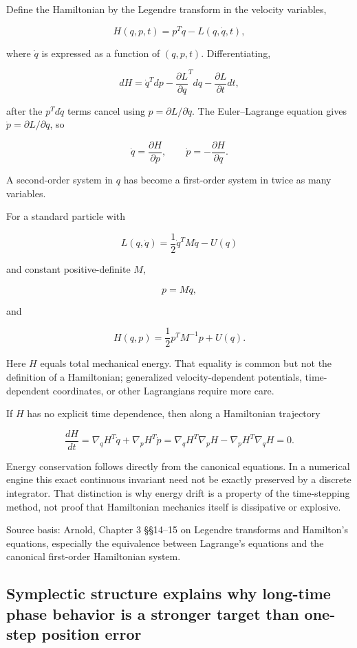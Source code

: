 Define the Hamiltonian by the Legendre transform in the velocity variables,

\[
H(q,p,t)
=
p^T\dot q-L(q,\dot q,t),
\]

where \(\dot q\) is expressed as a function of \((q,p,t)\). Differentiating,

\[
dH
=
\dot q^Tdp
-
\frac{\partial L}{\partial q}^Tdq
-
\frac{\partial L}{\partial t}dt,
\]

after the \(p^Td\dot q\) terms cancel using \(p=\partial L/\partial\dot q\). The Euler--Lagrange equation gives \(\dot p=\partial L/\partial q\), so

\[
\boxed{
\dot q=
\frac{\partial H}{\partial p},
\qquad
\dot p=
-\frac{\partial H}{\partial q}.
}
\]

A second-order system in \(q\) has become a first-order system in twice as many variables.

For a standard particle with

\[
L(q,\dot q)
=
\frac12\dot q^TM\dot q-U(q)
\]

and constant positive-definite \(M\),

\[
p=M\dot q,
\]

and

\[
H(q,p)
=
\frac12p^TM^{-1}p+U(q).
\]

Here \(H\) equals total mechanical energy. That equality is common but not the definition of a Hamiltonian; generalized velocity-dependent potentials, time-dependent coordinates, or other Lagrangians require more care.

If \(H\) has no explicit time dependence, then along a Hamiltonian trajectory

\[
\frac{dH}{dt}
=
\nabla_qH^T\dot q
+
\nabla_pH^T\dot p
=
\nabla_qH^T\nabla_pH
-
\nabla_pH^T\nabla_qH
=
0.
\]

Energy conservation follows directly from the canonical equations. In a numerical engine this exact continuous invariant need not be exactly preserved by a discrete integrator. That distinction is why energy drift is a property of the time-stepping method, not proof that Hamiltonian mechanics itself is dissipative or explosive.

Source basis: Arnold, Chapter 3 §§14--15 on Legendre transforms and Hamilton's equations, especially the equivalence between Lagrange's equations and the canonical first-order Hamiltonian system.

\subsection{Symplectic structure explains why long-time phase behavior is a stronger target than one-step position error}\label{02-foundations-ii-ch039-symplectic-structure-explains-why-long-time-phase-behavior-is-a-stronger-target-than-one-step-position-error}

